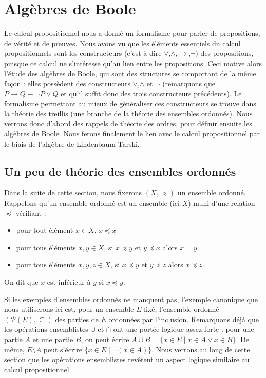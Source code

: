 \section{Algèbres de Boole}

Le calcul propositionnel nous a donné un formalisme pour parler de propositions, de vérité et de preuves. Nous avons vu que les éléments essentiels du calcul propositionnels sont les constructeurs (c'est-à-dire $\lor$,$\land$,$\to$,$\lnot$) des propositions, puisque ce calcul ne s'intéresse qu'au lien entre les propositions. Ceci motive alors l'étude des algèbres de Boole, qui sont des structures se comportant de la même façon : elles possèdent des constructeurs $\lor$,$\land$ et $\lnot$ (remarquons que $P \to Q \equiv \lnot P \lor Q$ et qu'il suffit donc des trois constructeurs précédents). Le formalisme permettant au mieux de généraliser ces constructeurs se trouve dans la théorie des treillis (une branche de la théorie des ensembles ordonnés). Nous verrons donc d'abord des rappels de théorie des ordres, pour définir ensuite les algèbres de Boole. Nous ferons finalement le lien avec le calcul propositionnel par le biais de l'algèbre de Lindenbaum-Tarski.

\subsection{Un peu de théorie des ensembles ordonnés}

Dans la suite de cette section, nous fixerons $(X,\preceq)$ un ensemble ordonné. Rappelons qu'un ensemble ordonné est un ensemble (ici $X$) muni d'une relation $\preceq$ vérifiant :
\begin{itemize}[label=$\bullet$]
    \item pour tout élément $x\in X$, $x\preceq x$
    \item pour tous éléments $x,y \in X$, si $x\preceq y$ et $y\preceq x$ alors $x=y$
    \item pour tous éléments $x,y,z \in X$, si $x\preceq y$ et $y\preceq z$ alors $x\preceq z$.
\end{itemize}
On dit que $x$ est inférieur à $y$ si $x\preceq y$.

\begin{expl}
    Si les exemples d'ensembles ordonnés ne manquent pas, l'exemple canonique que nous utiliserons ici est, pour un ensemble $E$ fixé, l'ensemble ordonné $(\mathcal P(E),\subseteq)$ des parties de $E$ ordonnées par l'inclusion. Remarquons déjà que les opérations ensemblistes $\cup$ et $\cap$ ont une portée logique assez forte : pour une partie $A$ et une partie $B$, on peut écrire $A\cup B =\{x\in E\mid x\in A \lor x\in B\}$. De même, $E\setminus A$ peut s'écrire $\{x\in E\mid \lnot (x\in A)\}$. Nous verrons au long de cette section que les opérations ensemblistes revêtent un aspect logique similaire au calcul propositionnel.
\end{expl}

